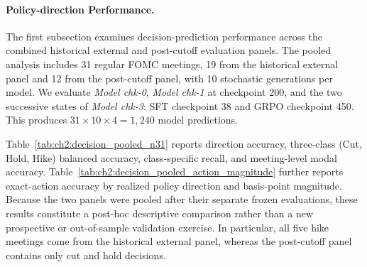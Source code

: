 \paragraph*{Policy-direction Performance.} The first subsection examines decision-prediction performance across the combined historical external and post-cutoff evaluation panels. The pooled analysis includes 31 regular FOMC meetings, 19 from the historical external panel and 12 from the post-cutoff panel, with 10 stochastic generations per model. We evaluate \textit{Model chk-0}, \textit{Model chk-1} at checkpoint 200, and the two successive states of \textit{Model chk-3}: SFT checkpoint 38 and GRPO checkpoint 450. This produces \(31 \times 10 \times 4 = 1{,}240\) model predictions.


Table~\ref{tab:ch2:decision_pooled_n31} reports direction accuracy, three-class (Cut, Hold, Hike) balanced accuracy, class-specific recall, and meeting-level modal accuracy. Table~\ref{tab:ch2:decision_pooled_action_magnitude} further reports exact-action accuracy by realized policy direction and basis-point magnitude. Because the two panels were pooled after their separate frozen evaluations, these results constitute a post-hoc descriptive comparison rather than a new prospective or out-of-sample validation exercise. In particular, all five hike meetings come from the historical external panel, whereas the post-cutoff panel contains only cut and hold decisions.


